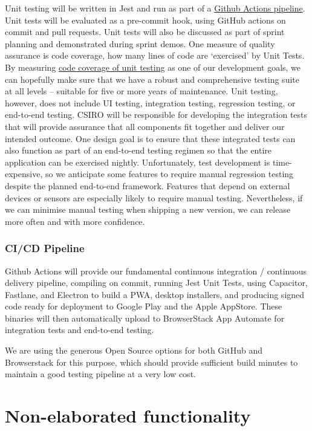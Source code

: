 \documentclass[a4paper,headings=small fontsize=10pt]{scrreprt}
\begin{document}
Unit testing will be written in Jest and run as part of a
\href{https://github.com/FAIMS/FAIMS3-Elaboration/blob/master/.github/workflows/node.js.yml}{{Github
Actions pipeline}}. Unit tests will be evaluated as a pre-commit hook,
using GitHub actions on commit and pull requests. Unit tests will also
be discussed as part of sprint planning and demonstrated during sprint
demos. One measure of quality assurance is code coverage, how many lines
of code are `exercised' by Unit Tests. By measuring
\href{https://jestjs.io/docs/en/cli.html\#--coverageboolean}{{code
coverage of unit testing}} as one of our development goals, we can
hopefully make sure that we have a robust and comprehensive testing
suite at all levels -- suitable for five or more years of maintenance.
Unit testing, however, does not include UI testing, integration testing,
regression testing, or end-to-end testing. CSIRO will be responsible for
developing the integration tests that will provide assurance that all
components fit together and deliver our intended outcome. One design
goal is to ensure that these integrated tests can also function as part
of an end-to-end testing regimen so that the entire application can be
exercised nightly. Unfortunately, test development is time-expensive, so
we anticipate some features to require manual regression testing despite
the planned end-to-end framework. Features that depend on external
devices or sensors are especially likely to require manual testing.
Nevertheless, if we can minimise manual testing when shipping a new
version, we can release more often and with more confidence.

\subsection{CI/CD Pipeline}

Github Actions will provide our fundamental continuous integration /
continuous delivery pipeline, compiling on commit, running Jest Unit
Tests, using Capacitor, Fastlane, and Electron to build a PWA, desktop
installers, and producing signed code ready for deployment to Google
Play and the Apple AppStore. These binaries will then automatically
upload to BrowserStack App Automate for integration tests and end-to-end
testing.

We are using the generous Open Source options for both GitHub and
Browserstack for this purpose, which should provide sufficient build
minutes to maintain a good testing pipeline at a very low cost.

\chapter{Non-elaborated
functionality}
\end{document}

